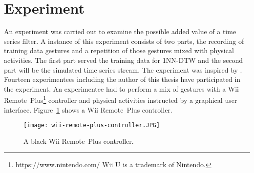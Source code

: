 \section{Experiment} \label{experiment}
An experiment was carried out to examine the possible added value of a time series filter. A instance of this experiment
consists of two parts, the recording of training data gestures and a repetition of those gestures mixed with physical
activities. The first part served the training data for 1NN-DTW and the second part will be the simulated time series
stream. The experiment was inspired by \cite{liu2009uwave}. Fourteen experimentees including the author of this thesis
have participated in the experiment. An experimentee had to perform a mix of gestures with a Wii
Remote\texttrademark~Plus\footnote{https://www.nintendo.com/ Wii U is a trademark of Nintendo.} controller and physical
activities instructed by a graphical user interface. Figure~\ref{fig:wii-remote} shows a Wii Remote\texttrademark~Plus
controller.
\begin{figure}
    \begin{center}
        \texttt{[image: wii-remote-plus-controller.JPG]}
    \end{center}
    \caption{A black Wii Remote\texttrademark~Plus controller.}
    \label{fig:wii-remote}
\end{figure}




